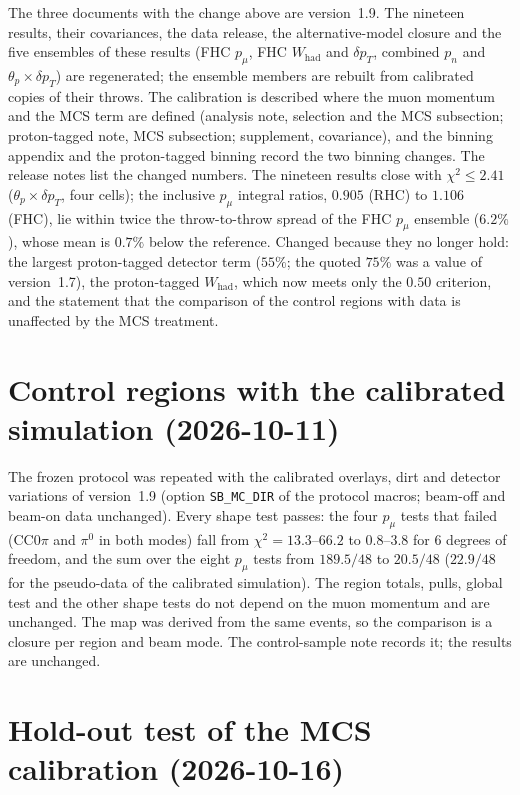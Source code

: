 The three documents with the change above are version~1.9. The nineteen results, their covariances, the data release,
the alternative-model closure and the five ensembles of these results (FHC $p_\mu$, FHC $W_\mathrm{had}$ and $\delta
p_T$, combined $p_n$ and $\theta_p\times\delta p_T$) are regenerated; the ensemble members are rebuilt from calibrated
copies of their throws. The calibration is described where the muon momentum and the MCS term are defined (analysis
note, selection and the MCS subsection; proton-tagged note, MCS subsection; supplement, covariance), and the
binning appendix and the proton-tagged binning record the two binning changes. The release notes list the changed
numbers. The nineteen results close with $\chi^2\le2.41$ ($\theta_p\times\delta p_T$, four cells); the inclusive $p_\mu$
integral ratios, $0.905$ (RHC) to $1.106$ (FHC), lie within twice the throw-to-throw spread of the FHC $p_\mu$ ensemble
($6.2\%$), whose mean is $0.7\%$ below the reference. Changed because they no longer hold: the largest
proton-tagged detector term ($55\%$; the quoted $75\%$ was a value of version~1.7), the proton-tagged $W_\mathrm{had}$,
which now meets only the $0.50$ criterion, and the statement that the comparison of the control regions with data
is unaffected by the MCS treatment.

\section{Control regions with the calibrated simulation (2026-10-11)}

The frozen protocol was repeated with the calibrated overlays, dirt and detector variations of version~1.9 (option
\texttt{SB\_MC\_DIR} of the protocol macros; beam-off and beam-on data unchanged). Every shape test passes: the four
$p_\mu$ tests that failed (CC$0\pi$ and $\pi^0$ in both modes) fall from $\chi^2=13.3$--$66.2$ to $0.8$--$3.8$ for $6$
degrees of freedom, and the sum over the eight $p_\mu$ tests from $189.5/48$ to $20.5/48$ ($22.9/48$ for the
pseudo-data of the calibrated simulation). The region totals, pulls, global test and the other shape tests do not
depend on the muon momentum and are unchanged. The map was derived from the same events, so the comparison is a
closure per region and beam mode. The control-sample note records it; the results are unchanged.

\section{Hold-out test of the MCS calibration (2026-10-16)}

